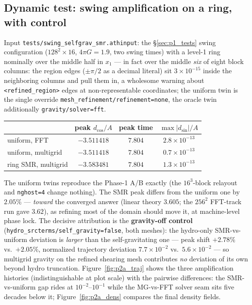 \documentclass[11pt]{article}
\newcommand{\code}[1]{\texttt{#1}}
\begin{document}
\subsection{Dynamic test: swing amplification on a ring, with control}
\label{sec:p2a_swing}
Input \code{tests/swing\_selfgrav\_smr.athinput}: the \S\ref{sec:p1_tests} swing
configuration ($128^2{\times}16$, $4\pi G = 1.9$, two swing times) with a level-1
ring nominally over the middle half in $x_1$ --- in fact over the middle
\emph{six} of eight block columns: the region edges ($\pm\pi/2$ as a decimal
literal) sit $3\times10^{-15}$ inside the neighboring columns and pull them in,
a wholesome warning about \code{<refined\_region>} edges at non-representable
coordinates; the uniform twin is the single override
\code{mesh\_refinement/refinement=none}, the oracle twin additionally
\code{gravity/solver=fft}.
\begin{center}
\small
\begin{tabular}{@{}lccc@{}}
\toprule
 & peak $d_{\cos}/A$ & peak time & $\max|d_{\sin}|/A$ \\
\midrule
uniform, FFT       & $-3.511418$ & $7.804$ & $2.8\times10^{-13}$ \\
uniform, multigrid & $-3.511418$ & $7.804$ & $0.7\times10^{-13}$ \\
ring SMR, multigrid & $-3.583481$ & $7.804$ & $1.3\times10^{-13}$ \\
\bottomrule
\end{tabular}
\end{center}
The uniform twins reproduce the Phase-1 A/B exactly (the $16^3$-block relayout and
\code{nghost=4} change nothing). The SMR peak differs from the uniform one by
$2.05\%$ --- \emph{toward} the converged answer (linear theory $3.605$; the
$256^2$ FFT-track run gave $3.62$), as refining most of the domain should move it, at
machine-level phase lock. The decisive attribution is the \textbf{gravity-off
control} (\code{hydro\_srcterms/self\_gravity=false}, both meshes): the hydro-only
SMR-vs-uniform deviation is \emph{larger} than the self-gravitating one --- peak
shift $+2.78\%$ vs.\ $+2.05\%$, normalized trajectory deviation $7.7\times10^{-2}$
vs.\ $5.6\times10^{-2}$ --- so multigrid gravity on the refined shearing mesh
contributes \emph{no} deviation of its own beyond hydro truncation.
Figure~\ref{fig:p2a_traj} shows the three amplification histories (indistinguishable
at plot scale) with the pairwise differences: the SMR-vs-uniform gap rides at
$10^{-2}$--$10^{-1}$ while the MG-vs-FFT solver seam sits five decades below it;
Figure~\ref{fig:p2a_dens} compares the final density fields.
\end{document}
